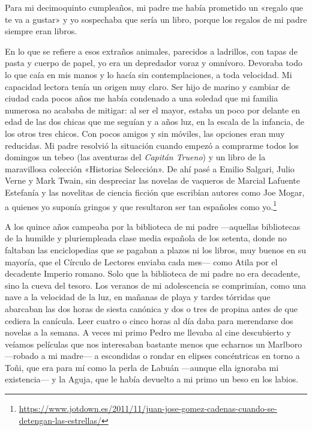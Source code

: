 \label{cap:nolan}

Para mi decimoquinto cumpleaños, mi padre me había prometido un «regalo que te va a gustar» y yo sospechaba que sería un libro, porque los regalos de mi padre siempre eran libros.

En lo que se refiere a esos extraños animales, parecidos a ladrillos, con tapas de pasta y cuerpo de papel, yo era un depredador voraz y omnívoro. Devoraba todo lo que caía en mis manos y lo hacía sin contemplaciones, a toda velocidad. Mi capacidad lectora tenía un origen muy claro. Ser hijo de marino y cambiar de ciudad cada pocos años me había condenado a una soledad que mi familia numerosa no acababa de mitigar: al ser el mayor, estaba un poco por delante en edad de las dos chicas que me seguían y a años luz, en la escala de la infancia, de los otros tres chicos. Con pocos amigos y sin móviles, las opciones eran muy reducidas. Mi padre resolvió la situación cuando empezó a comprarme todos los domingos un tebeo (las aventuras del \emph{Capitán Trueno}) y un libro de la maravillosa colección «Historias Selección». De ahí pasé a Emilio Salgari, Julio Verne y Mark Twain, sin despreciar las novelas de vaqueros de Marcial Lafuente Estefanía y las novelitas de ciencia ficción que escribían autores como Joe Mogar, a quienes yo suponía gringos y que resultaron ser tan españoles como yo.\footnote{\url{https://www.jotdown.es/2011/11/juan-jose-gomez-cadenas-cuando-se-detengan-las-estrellas/}}

A los quince años campeaba por la biblioteca de mi padre ---aquellas bibliotecas de la humilde y pluriempleada clase media española de los setenta, donde no faltaban las enciclopedias que se pagaban a plazos ni los libros, muy buenos en su mayoría, que el Círculo de Lectores enviaba cada mes--- como Atila por el decadente Imperio romano. Solo que la biblioteca de mi padre no era decadente, sino la cueva del tesoro. Los veranos de mi adolescencia se comprimían, como una nave a la velocidad de la luz, en mañanas de playa y tardes tórridas que abarcaban las dos horas de siesta canónica y dos o tres de propina antes de que cediera la canícula. Leer cuatro o cinco horas al día daba para merendarse dos novelas a la semana. A veces mi primo Pedro me llevaba al cine descubierto y veíamos películas que nos interesaban bastante menos que echarnos un Marlboro ---robado a mi madre--- a escondidas o rondar en elipses concéntricas en torno a Toñi, que era para mí como la perla de Labuán ---aunque ella ignoraba mi existencia--- y la Aguja, que le había devuelto a mi primo un beso en los labios.

